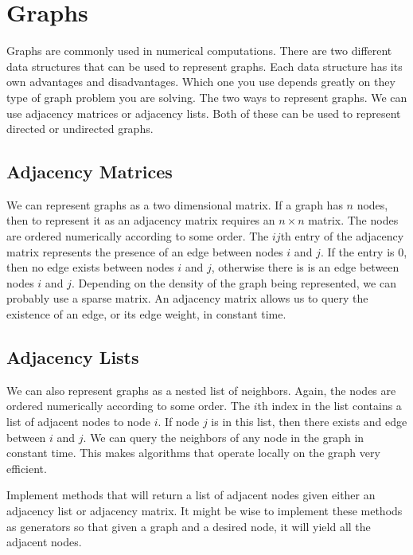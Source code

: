 \section*{Graphs}
Graphs are commonly used in numerical computations.
There are two different data structures that can be used to represent graphs.
Each data structure has its own advantages and disadvantages.
Which one you use depends greatly on they type of graph problem you are solving.
The two ways to represent graphs.  We can use adjacency matrices or adjacency lists.
Both of these can be used to represent directed or undirected graphs.

\subsection*{Adjacency Matrices}
We can represent graphs as a two dimensional matrix.  If a graph has $n$ nodes, then
to represent it as an adjacency matrix requires an $n \times n$ matrix.
The nodes are ordered numerically according to some order.
The $ij$th entry of the adjacency matrix represents the presence of an edge between nodes $i$ and $j$.
If the entry is 0, then no edge exists between nodes $i$ and $j$, otherwise there is is an edge between nodes $i$ and $j$.
Depending on the density of the graph being represented, we can probably use a sparse matrix.
An adjacency matrix allows us to query the existence of an edge, or its edge weight, in constant time.

\subsection*{Adjacency Lists}
We can also represent graphs as a nested list of neighbors.
Again, the nodes are ordered numerically according to some order.
The $i$th index in the list contains a list of adjacent nodes to node $i$.  
If node $j$ is in this list, then there exists and edge between $i$ and $j$.
We can query the neighbors of any node in the graph in constant time.
This makes algorithms that operate locally on the graph very efficient. 

\begin{problem}
Implement methods that will return a list of adjacent nodes given either an adjacency list or adjacency matrix.
It might be wise to implement these methods as generators so that given a graph and a desired node, it will yield all the adjacent nodes.
\end{problem}

